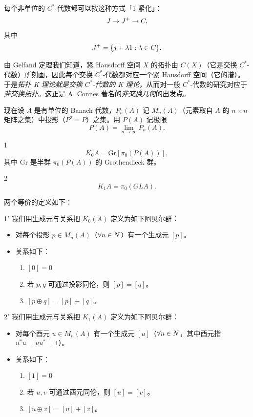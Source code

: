 每个非单位的 $C^*$-代数都可以按这种方式「1-紧化」：
\[
  J \to J^+ \to C,
\]
其中
\[
  J^+ = \{j+\lambda 1 : \lambda\in C\}.
\]

由 Gelfand 定理我们知道，紧 Hausdorff 空间 $X$ 的拓扑由 $C(X)$（它是交换 $C^*$-代数）所刻画，因此每个交换 $C^*$-代数都对应一个紧 Hausdorff 空间（它的谱）。于是\emph{拓扑 K 理论就是交换 $C^*$-代数的 K 理论}，从而对一般 $C^*$-代数的研究对应于\emph{非交换拓扑}。这正是 A. Connes 著名的\emph{非交换几何}的出发点。


现在设 $A$ 是有单位的 Banach 代数，$P_n(A)$ 记 $M_n(A)$（元素取自 $A$ 的 $n\times n$ 矩阵之集）中投影（$P^2=P$）之集。用 $P(A)$ 记极限
\[
  P(A) = \lim_{n\to\infty} P_n(A).
\]

\begin{defn}{1}
\[
  K_0 A = \mathrm{Gr}[\pi_0(P(A))],
\]
其中 $\mathrm{Gr}$ 是半群 $\pi_0(P(A))$ 的 Grothendieck 群。
\end{defn}

\begin{defn}{2}
\[
  K_1 A = \pi_0(GL A).
\]
\end{defn}

两个等价的定义如下：

\begin{defn}{1$'$}
我们用生成元与关系把 $K_0(A)$ 定义为如下阿贝尔群：
\begin{itemize}
\item 对每个投影 $p\in M_n(A)$（$\forall n\in N$）有一个生成元 $[p]$。
\item 关系如下：
  \begin{enumerate}[label=\roman*.]
  \item $[0]=0$
  \item 若 $p,q$ 可通过投影同伦，则 $[p]=[q]$。
  \item $[p\oplus q]=[p]+[q]$。
  \end{enumerate}
\end{itemize}
\end{defn}

\begin{defn}{2$'$}
我们用生成元与关系把 $K_1(A)$ 定义为如下阿贝尔群：
\begin{itemize}
\item 对每个酉元 $u\in M_n(A)$ 有一个生成元 $[u]$（$\forall n\in N$，其中酉元指 $u^*u=uu^*=1$）。
\item 关系如下：
  \begin{enumerate}[label=\roman*.]
  \item $[1]=0$
  \item 若 $u,v$ 可通过酉元同伦，则 $[u]=[v]$。
  \item $[u\oplus v]=[u]+[v]$。
  \end{enumerate}
\end{itemize}
\end{defn}

